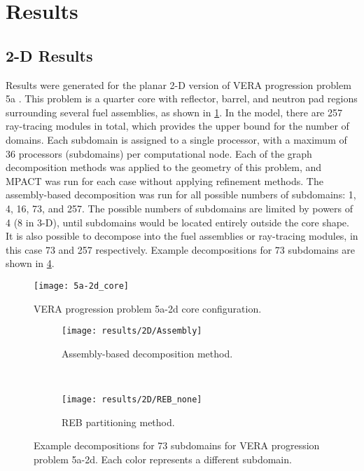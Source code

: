 {  \section{Results}{\label{sec:Spatial Decomposition:Results}
    \subsection{2-D Results}{\label{ssec:Spatial Decomposition:2-D Results}
      Results were generated for the planar 2-D version of VERA progression problem 5a \cite{VERAProblems}.
      This problem is a quarter core with reflector, barrel, and neutron pad regions surrounding several fuel assemblies, as shown in \cref{fig:Spatial Decomposition:5a-2d}.
      In the model, there are 257 ray-tracing modules in total, which provides the upper bound for the number of domains.
      Each subdomain is assigned to a single processor, with a maximum of 36 processors (subdomains) per computational node.
      Each of the graph decomposition methods was applied to the geometry of this problem, and MPACT was run for each case without applying refinement methods.
      The assembly-based decomposition was run for all possible numbers of subdomains: 1, 4, 16, 73, and 257.
      The possible numbers of subdomains are limited by powers of 4 (8 in 3-D), until subdomains would be located entirely outside the core shape.
      It is also possible to decompose into the fuel assemblies or ray-tracing modules, in this case 73 and 257 respectively.
      Example decompositions for 73 subdomains are shown in \cref{fig:Spatial Decomposition:5a-2d example decomp}.

      \begin{figure}
        \centering
        \texttt{[image: 5a-2d\_core]}
        \caption{VERA progression problem 5a-2d core configuration. \label{fig:Spatial Decomposition:5a-2d}}
      \end{figure}

      \begin{figure}[H]
        \centering
        \begin{subfigure}[t]{0.45\textwidth}
          \centering
          \texttt{[image: results/2D/Assembly]}
          \caption{Assembly-based decomposition method. \label{fig:Spatial Decomposition:5a-2d 73 Assembly}}
        \end{subfigure}%
        ~
        \begin{subfigure}[t]{0.45\textwidth}
          \centering
          \texttt{[image: results/2D/REB\_none]}
          \caption{\ac{REB} partitioning method. \label{fig:Spatial Decomposition:5a-2d 73 REB None}}
        \end{subfigure}
        \caption{
          Example decompositions for 73 subdomains for VERA progression problem 5a-2d.
          Each color represents a different subdomain.
          \label{fig:Spatial Decomposition:5a-2d example decomp}
        }
      \end{figure}

}}}
